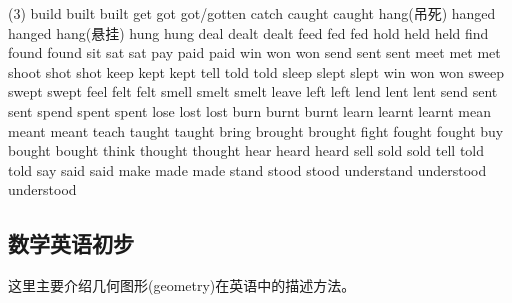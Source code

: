\documentclass[a4paper]{article}
\begin{document}
\begin{tasks}[style=enumerate](3)
  \task[+] build  \task[+] built   \task[+] built
  \task[+] get    \task[+] got     \task[+] got/gotten
  \task[+] catch    \task[+] caught     \task[+]caught
  \task[+] hang(吊死)    \task[+] hanged     \task[+]hanged
  \task[+] hang(悬挂)    \task[+] hung     \task[+]hung
  \task[+] deal    \task[+] dealt    \task[+]dealt
  \task[+] feed    \task[+] fed     \task[+]fed
  \task[+] hold    \task[+] held     \task[+]held
  \task[+] find    \task[+] found     \task[+]found
  \task[+] sit    \task[+] sat     \task[+] sat
  \task[+] pay    \task[+] paid     \task[+] paid
  \task[+] win    \task[+] won    \task[+] won
  \task[+] send    \task[+] sent    \task[+] sent
  \task[+] meet    \task[+] met   \task[+] met
  \task[+] shoot    \task[+] shot   \task[+] shot
  \task[+] keep    \task[+] kept   \task[+] kept
  \task[+] tell    \task[+] told   \task[+] told
  \task[+] sleep    \task[+] slept   \task[+] slept
  \task[+] win    \task[+] won  \task[+] won
  \task[+] sweep    \task[+] swept  \task[+] swept
  \task[+] feel    \task[+] felt  \task[+] felt
  \task[+] smell    \task[+] smelt  \task[+] smelt
  \task[+] leave    \task[+] left  \task[+] left
  \task[+] lend    \task[+] lent  \task[+] lent
  \task[+] send    \task[+] sent  \task[+] sent
  \task[+] spend    \task[+] spent  \task[+] spent
  \task[+] lose    \task[+] lost  \task[+] lost
  \task[+] burn    \task[+] burnt  \task[+] burnt
  \task[+] learn    \task[+] learnt  \task[+] learnt
  \task[+] mean    \task[+] meant  \task[+] meant
  \task[+] teach    \task[+] taught  \task[+] taught
  \task[+] bring    \task[+] brought  \task[+] brought
  \task[+] fight    \task[+] fought  \task[+] fought
  \task[+] buy    \task[+] bought  \task[+] bought
  \task[+] think    \task[+] thought  \task[+] thought
  \task[+] hear   \task[+] heard  \task[+] heard
  \task[+] sell    \task[+] sold  \task[+] sold
  \task[+] tell    \task[+] told  \task[+] told
  \task[+] say    \task[+] said  \task[+] said
  \task[+] make    \task[+] made  \task[+] made
  \task[+] stand    \task[+] stood  \task[+] stood
  \task[+] understand    \task[+] understood  \task[+] understood

 \end{tasks}

  \subsection{数学英语初步}

这里主要介绍几何图形(geometry)在英语中的描述方法。
\end{document}
